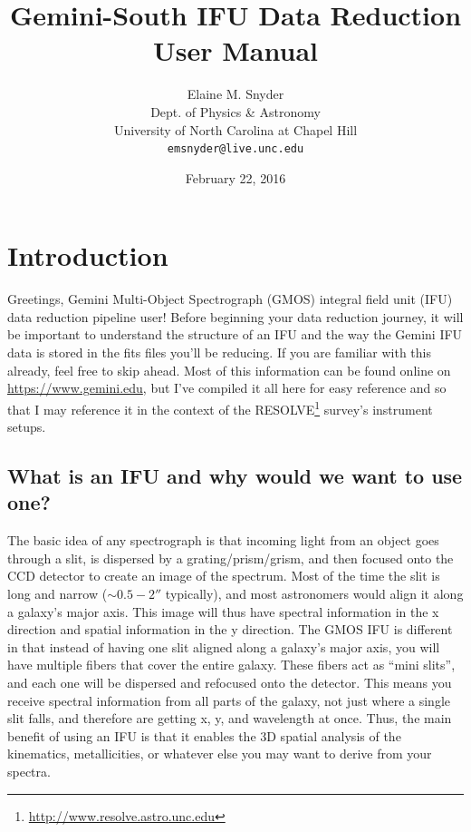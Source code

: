 \documentclass[12pt]{report}
\begin{document}
\title{Gemini-South IFU Data Reduction User Manual}
\author{Elaine M. Snyder\\
Dept. of Physics \& Astronomy\\
University of North Carolina at Chapel Hill \\
\texttt{emsnyder@live.unc.edu}}
\date{February 22, 2016}
\maketitle

\hypersetup{linkcolor=magenta}
\tableofcontents
\begingroup
\let\clearpage\relax
\listoffigures
\listoftables
\endgroup


\chapter{Introduction}
Greetings, Gemini Multi-Object Spectrograph (GMOS) integral field unit (IFU) data reduction pipeline user! Before beginning your data reduction journey, it will be important to understand the structure of an IFU and the way the Gemini IFU data is stored in the fits files you'll be reducing. If you are familiar with this already, feel free to skip ahead. Most of this information can be found online on \url{https://www.gemini.edu}, but I've compiled it all here for easy reference and so that I may reference it in the context of the RESOLVE\footnote{\url{http://www.resolve.astro.unc.edu}} survey's instrument setups.

\section{What is an IFU and why would we want to use one?}
\label{ifu}
The basic idea of any spectrograph is that incoming light from an object goes through a slit, is dispersed by a grating/prism/grism, and then focused onto the CCD detector to create an image of the spectrum. Most of the time the slit is long and narrow ($\sim0.5-2''$ typically), and most astronomers would align it along a galaxy's major axis. This image will thus have spectral information in the x direction and spatial information in the y direction. The GMOS IFU is different in that instead of having one slit aligned along a galaxy's major axis, you will have multiple fibers that cover the entire galaxy. These fibers act as ``mini slits'', and each one will be dispersed and refocused onto the detector. This means you receive spectral information from all parts of the galaxy, not just where a single slit falls, and therefore are getting x, y, and wavelength at once. Thus, the main benefit of using an IFU is that it enables the 3D spatial analysis of the kinematics, metallicities, or whatever else you may want to derive from your spectra.
\end{document}
